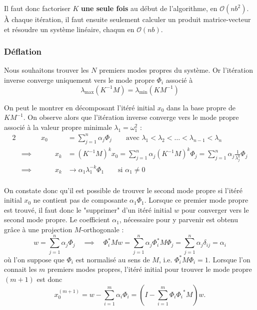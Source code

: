 \documentclass[12pt]{article}
\begin{document}
Il faut donc factoriser $K$ \textbf{une seule fois} au début de l'algorithme, 
en $\mathcal{O}(nb^2)$. 
À chaque itération, il faut ensuite seulement calculer un produit 
matrice-vecteur et résoudre un système linéaire, chaqun en $\mathcal{O}(n b)$.

\subsubsection{Déflation}
Nous souhaitons trouver les $N$ premiers modes propres du système. Or 
l'itération inverse converge uniquement vers le mode propre $\Phi_i$ 
associé à
\begin{equation}
    \lambda_{\max}(K^{-1} M)=\lambda_{\min}(K M^{-1})
\end{equation}

On peut le montrer en décomposant l'itéré initial $x_0$ dans la base propre de 
$K M^{-1}$. On observe alors que l'itération inverse converge vers le mode 
propre associé à la valeur propre minimale $\lambda_1 = \omega_1^2$ :
\begin{alignat}{2}
    & \qquad & x_0 &= \sum_{j=1}^{n} \alpha_j \Phi_j \qquad \text{avec }
    \lambda_1 < \lambda_2 < \dots < \lambda_{n-1} < \lambda_n\\
    &\implies &\qquad x_{k} &= (K^{-1} M)^k x_{0} = \sum_{j=1}^{n} \alpha_j (K^{-1} M)^{k} \Phi_j
        = \sum_{j=1}^{n} \alpha_j \frac{1}{\lambda_j^k} \Phi_j\\
    &\implies &\qquad x_{k} &\to \alpha_1 \lambda_1^{-k} \Phi_1
        \qquad \text{si } \alpha_1 \neq 0\\
\end{alignat}

On constate donc qu'il est possible de trouver le second mode propre si l'itéré
initial $x_0$ ne contient pas de composante $\alpha_1\Phi_1$. Lorsque ce premier 
mode propre est trouvé, il faut donc le "supprimer" d'un itéré initial $w$ pour 
converger vers le second mode propre. Le coefficient $\alpha_1$, nécessaire 
pour y parvenir est obtenu grâce à une projection $M$-orthogonale :
\begin{equation}
    w = \sum_{j=1}^{n} \alpha_j \Phi_j \quad\implies\quad
    \Phi_i^* M w = \sum_{j=1}^{n} \alpha_j \Phi_i^* M \Phi_j
    = \sum_{j=1}^{n} \alpha_j \delta_{ij} = \alpha_i
\end{equation}
où l'on suppose que $\Phi_i$ est normalisé au sens de $M$, i.e. 
$\Phi_i^* M \Phi_i = 1$. 
Lorsque l'on connait les $m$ premiers modes propres, l'itéré initial pour 
trouver le mode propre $(m+1)$ est donc
\begin{equation}
    x_0^{(m+1)} = w - \sum_{i=1}^{m}\alpha_i \Phi_i 
    = \left(I - \sum_{i=1}^m \Phi_i {\Phi_i}^* M\right) w.
\end{equation}
\end{document}
